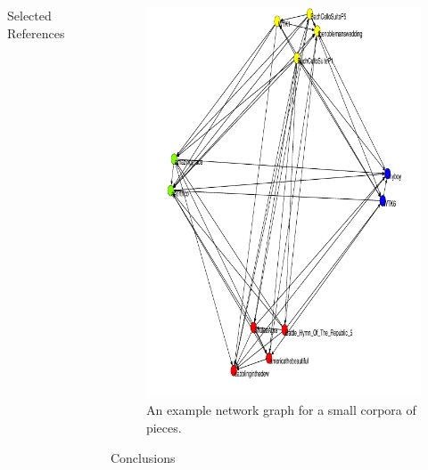 \documentclass[final]{beamer}
\newlength{\sepwid}
\newlength{\onecolwid}
\newlength{\onecolwidtwo}
\begin{document}
\begin{frame}[t]
\begin{columns}[t]
\begin{column}{\onecolwidtwo}
\begin{column}{\onecolwidtwo}
\begin{block}{Selected References}
\end{block}
\end{column}

\end{column} %

\begin{column}{\sepwid}\end{column} %

\begin{column}{\onecolwid} %

\begin{figure}
\includegraphics[width=1\onecolwid, height=.66\onecolwid]{Visuals/clippedgraph.pdf}
\caption{An example network graph for a small corpora of pieces.}
\label{graph}
\end{figure}
\vskip2in\begin{alertblock}{Conclusions}

\end{alertblock}
\end{column}
\end{columns}
\end{frame}
\end{document}
